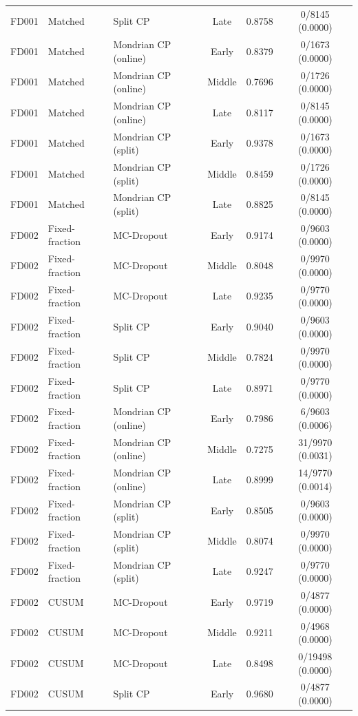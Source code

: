 \begin{table}[t]
\begin{tabular}{lllccc}
FD001 & Matched & Split CP & Late & 0.8758 & 0/8145 (0.0000) \\
FD001 & Matched & Mondrian CP (online) & Early & 0.8379 & 0/1673 (0.0000) \\
FD001 & Matched & Mondrian CP (online) & Middle & 0.7696 & 0/1726 (0.0000) \\
FD001 & Matched & Mondrian CP (online) & Late & 0.8117 & 0/8145 (0.0000) \\
FD001 & Matched & Mondrian CP (split) & Early & 0.9378 & 0/1673 (0.0000) \\
FD001 & Matched & Mondrian CP (split) & Middle & 0.8459 & 0/1726 (0.0000) \\
FD001 & Matched & Mondrian CP (split) & Late & 0.8825 & 0/8145 (0.0000) \\
FD002 & Fixed-fraction & MC-Dropout & Early & 0.9174 & 0/9603 (0.0000) \\
FD002 & Fixed-fraction & MC-Dropout & Middle & 0.8048 & 0/9970 (0.0000) \\
FD002 & Fixed-fraction & MC-Dropout & Late & 0.9235 & 0/9770 (0.0000) \\
FD002 & Fixed-fraction & Split CP & Early & 0.9040 & 0/9603 (0.0000) \\
FD002 & Fixed-fraction & Split CP & Middle & 0.7824 & 0/9970 (0.0000) \\
FD002 & Fixed-fraction & Split CP & Late & 0.8971 & 0/9770 (0.0000) \\
FD002 & Fixed-fraction & Mondrian CP (online) & Early & 0.7986 & 6/9603 (0.0006) \\
FD002 & Fixed-fraction & Mondrian CP (online) & Middle & 0.7275 & 31/9970 (0.0031) \\
FD002 & Fixed-fraction & Mondrian CP (online) & Late & 0.8999 & 14/9770 (0.0014) \\
FD002 & Fixed-fraction & Mondrian CP (split) & Early & 0.8505 & 0/9603 (0.0000) \\
FD002 & Fixed-fraction & Mondrian CP (split) & Middle & 0.8074 & 0/9970 (0.0000) \\
FD002 & Fixed-fraction & Mondrian CP (split) & Late & 0.9247 & 0/9770 (0.0000) \\
FD002 & CUSUM & MC-Dropout & Early & 0.9719 & 0/4877 (0.0000) \\
FD002 & CUSUM & MC-Dropout & Middle & 0.9211 & 0/4968 (0.0000) \\
FD002 & CUSUM & MC-Dropout & Late & 0.8498 & 0/19498 (0.0000) \\
FD002 & CUSUM & Split CP & Early & 0.9680 & 0/4877 (0.0000) \\

\end{tabular}
\end{table}
